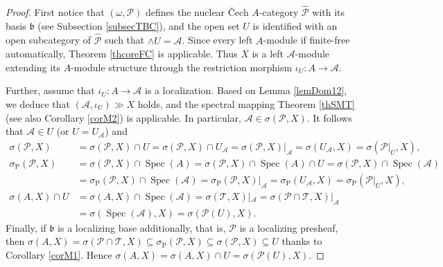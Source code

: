 \documentclass[12pt]{amsart}%
\theoremstyle{plain}
\numberwithin{equation}{section}
\numberwithin{equation}{section}
\numberwithin{theorem}{section}
\numberwithin{lemma}{section}
\numberwithin{remark}{section}
\numberwithin{example}{section}
\numberwithin{proposition}{section}
\numberwithin{definition}{section}
\numberwithin{corollary}{section}
\begin{document}
\begin{proof}
First notice that $\left(  \omega,\mathcal{P}\right)  $ defines the nuclear
\v{C}ech $A$-category $\widehat{\mathcal{P}}$ with its basis $\mathfrak{b}%
$\textit{ }(see Subsection \ref{subsecTBC}), and the open set $U$ is
identified with an open subcategory of $\widehat{\mathcal{P}}$ such that
$\wedge U=\mathcal{A}$. Since every left $A$-module if finite-free
automatically, Theorem \ref{thcoreFC} is applicable. Thus $X$ is a left
$\mathcal{A}$-module extending its $A$-module structure through the
restriction morphism $\iota_{U}:A\rightarrow\mathcal{A}$.

Further, assume that $\iota_{U}:A\rightarrow\mathcal{A}$ is a localization.
Based on Lemma \ref{lemDom12}, we deduce that $\left(  \mathcal{A},\iota
_{U}\right)  \gg X$ holds, and the spectral mapping Theorem \ref{thSMT} (see
also Corollary \ref{corM2}) is applicable. In particular, $\mathcal{A}%
\in\sigma\left(  \mathcal{P},X\right)  $. It follows that $\mathcal{A}\in U$
(or $U=U_{\mathcal{A}}$) and
\begin{align*}
\sigma\left(  \mathcal{P},X\right)   &  =\sigma\left(  \mathcal{P},X\right)
\cap U=\sigma\left(  \mathcal{P},X\right)  \cap U_{\mathcal{A}}=\sigma\left(
\mathcal{P},X\right)  |_{\mathcal{A}}=\sigma\left(  U_{\mathcal{A}},X\right)
=\sigma\left(  \mathcal{P}|_{U},X\right)  ,\\
\sigma_{\operatorname{P}}\left(  \mathcal{P},X\right)   &  =\sigma\left(
\mathcal{P},X\right)  \cap\operatorname{Spec}\left(  A\right)  =\sigma\left(
\mathcal{P},X\right)  \cap\operatorname{Spec}\left(  A\right)  \cap
U=\sigma\left(  \mathcal{P},X\right)  \cap\operatorname{Spec}\left(
\mathcal{A}\right) \\
&  =\sigma_{\operatorname{P}}\left(  \mathcal{P},X\right)  \cap
\operatorname{Spec}\left(  \mathcal{A}\right)  =\sigma_{\operatorname{P}%
}\left(  \mathcal{P},X\right)  |_{\mathcal{A}}=\sigma_{\operatorname{P}%
}\left(  U_{\mathcal{A}},X\right)  =\sigma_{\operatorname{P}}\left(
\mathcal{P}|_{U},X\right)  ,\\
\sigma\left(  A,X\right)  \cap U  &  =\sigma\left(  A,X\right)  \cap
\operatorname{Spec}\left(  \mathcal{A}\right)  =\sigma\left(  \mathcal{T}%
,X\right)  |_{\mathcal{A}}=\sigma\left(  \mathcal{P}\cap\mathcal{T},X\right)
|_{\mathcal{A}}\\
&  =\sigma\left(  \operatorname{Spec}\left(  \mathcal{A}\right)  ,X\right)
=\sigma\left(  \mathcal{P}\left(  U\right)  ,X\right)  .
\end{align*}
Finally, if $\mathfrak{b}$ is a localizing base additionally, that is,
$\mathcal{P}$ is a localizing presheaf, then $\sigma\left(  A,X\right)
=\sigma\left(  \mathcal{P}\cap\mathcal{T},X\right)  \subseteq\sigma
_{\operatorname{P}}\left(  \mathcal{P},X\right)  \subseteq\sigma\left(
\mathcal{P},X\right)  \subseteq U$ thanks to Corollary \ref{corM1}. Hence
$\sigma\left(  A,X\right)  =\sigma\left(  A,X\right)  \cap U=\sigma\left(
\mathcal{P}\left(  U\right)  ,X\right)  $.
\end{proof}
\end{document}
